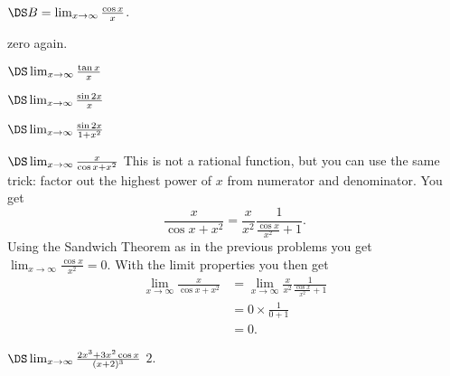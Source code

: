 \begin{multicols}{3}
\problem $\DS B = \lim_{x\to\infty} \frac{\cos x}{x}$. 

\answer
zero again.
\endanswer

\problem \carefulnow $\DS\lim_{x\to\infty} \frac{\tan x}{x}$ 

\problem $\DS\lim_{x\to\infty} \frac{\sin 2x}{x}$

\problem $\DS \lim_{x\to\infty} \frac{\sin 2x}{1+x^2}$

\problem $\DS \lim_{x\to\infty} \frac{x}{\cos x + x^2}$
\answer
This is not a rational function, but you can use the same trick:  factor out the
highest power of $x$ from numerator and denominator.  You get
\[
 \frac{x}{\cos x + x^2}
 = \frac{x}{x^2} \frac{1}{\frac{\cos x}{x^2} + 1}.
\]
Using the Sandwich Theorem as in the previous problems you get
$\lim_{x\to\infty} \frac{\cos x}{x^2} = 0$.  With the limit properties you then
get
\begin{align*}
  \lim_{x\to\infty}\frac{x}{\cos x + x^2}
 &= \lim_{x\to\infty}\frac{x}{x^2} \frac{1}{\frac{\cos x}{x^2} + 1}\\
 &= 0\times \frac{1}{0+1} \\
 &= 0.
\end{align*}

\endanswer
\problem $\DS \lim_{x\to\infty} \frac{2x^3+3x^2\cos x }{ (x+2)^3}$
\answer
$2$.
\endanswer

\end{multicols}

